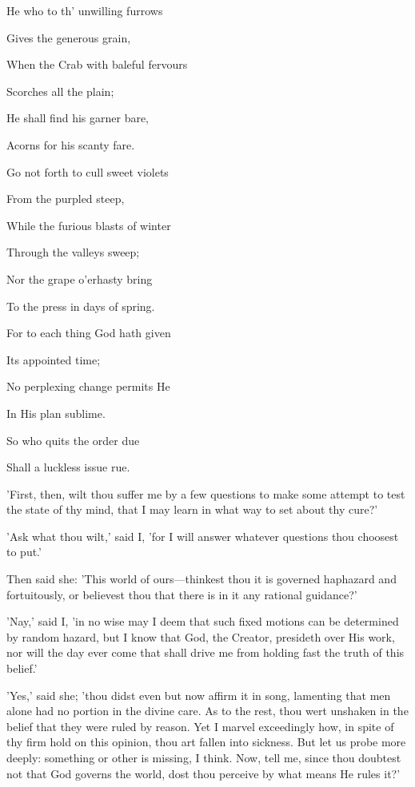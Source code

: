 
He who to th' unwilling furrows

Gives the generous grain,

When the Crab with baleful fervours

Scorches all the plain;

He shall find his garner bare,

Acorns for his scanty fare.

Go not forth to cull sweet violets

From the purpled steep,

While the furious blasts of winter

Through the valleys sweep;

Nor the grape o'erhasty bring

To the press in days of spring.

For to each thing God hath given

Its appointed time;

No perplexing change permits He

In His plan sublime.

So who quits the order due

Shall a luckless issue rue.


'First, then, wilt thou suffer me by a few questions to make some
attempt to test the state of thy mind, that I may learn in what way to
set about thy cure?'

'Ask what thou wilt,' said I, 'for I will answer whatever questions thou
choosest to put.'

Then said she: 'This world of ours—thinkest thou it is governed
haphazard and fortuitously, or believest thou that there is in it any
rational guidance?'

'Nay,' said I, 'in no wise may I deem that such fixed motions can be
determined by random hazard, but I know that God, the Creator, presideth
over His work, nor will the day ever come that shall drive me from
holding fast the truth of this belief.'

'Yes,' said she; 'thou didst even but now affirm it in song, lamenting
that men alone had no portion in the divine care. As to the rest, thou
wert unshaken in the belief that they were ruled by reason. Yet I
marvel exceedingly how, in spite of thy firm hold on this opinion, thou
art fallen into sickness. But let us probe more deeply: something or
other is missing, I think. Now, tell me, since thou doubtest not that
God governs the world, dost thou perceive by what means He rules it?'

